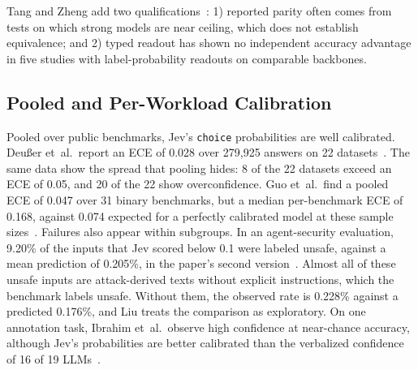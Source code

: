  Tang and Zheng add two qualifications~\cite{tang2026typed}: 1) reported parity often comes from tests on which strong models are near ceiling, which does not establish equivalence; and 2) typed readout has shown no independent accuracy advantage in five studies with label-probability readouts on comparable backbones.

\subsection{Pooled and Per-Workload Calibration}

Pooled over public benchmarks, Jev's \texttt{choice} probabilities are well calibrated. Deu{\ss}er et~al.\ report an ECE of 0.028 over 279{,}925 answers on 22 datasets~\cite{deusser2026evaluating}. The same data show the spread that pooling hides: 8 of the 22 datasets exceed an ECE of 0.05, and 20 of the 22 show overconfidence. Guo et~al.\ find a pooled ECE of 0.047 over 31 binary benchmarks, but a median per-benchmark ECE of 0.168, against 0.074 expected for a perfectly calibrated model at these sample sizes~\cite{guo2026just}. Failures also appear within subgroups. In an agent-security evaluation, 9.20\% of the inputs that Jev scored below 0.1 were labeled unsafe, against a mean prediction of 0.205\%, in the paper's second version~\cite{liu2026evaluating}. Almost all of these unsafe inputs are attack-derived texts without explicit instructions, which the benchmark labels unsafe. Without them, the observed rate is 0.228\% against a predicted 0.176\%, and Liu treats the comparison as exploratory. On one annotation task, Ibrahim et~al.\ observe high confidence at near-chance accuracy, although Jev's probabilities are better calibrated than the verbalized confidence of 16 of 19 LLMs~\cite{ibrahim2026evaluating}. 

